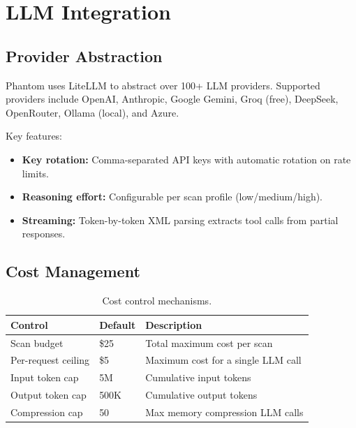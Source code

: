 \documentclass[12pt,a4paper]{report}
\begin{document}
\chapter{LLM Integration}

\section{Provider Abstraction}

Phantom uses LiteLLM to abstract over 100+ LLM providers. Supported providers include OpenAI, Anthropic, Google Gemini, Groq (free), DeepSeek, OpenRouter, Ollama (local), and Azure.

Key features:
\begin{itemize}
    \item \textbf{Key rotation:} Comma-separated API keys with automatic rotation on rate limits.
    \item \textbf{Reasoning effort:} Configurable per scan profile (low/medium/high).
    \item \textbf{Streaming:} Token-by-token XML parsing extracts tool calls from partial responses.
\end{itemize}

\section{Cost Management}

\begin{table}[H]
\centering
\caption{Cost control mechanisms.}
\begin{tabularx}{\textwidth}{llX}
\toprule
\textbf{Control} & \textbf{Default} & \textbf{Description} \\
\midrule
Scan budget         & \$25    & Total maximum cost per scan \\
Per-request ceiling & \$5     & Maximum cost for a single LLM call \\
Input token cap     & 5M      & Cumulative input tokens \\
Output token cap    & 500K    & Cumulative output tokens \\
Compression cap     & 50      & Max memory compression LLM calls \\
\bottomrule
\end{tabularx}
\end{table}
\end{document}
